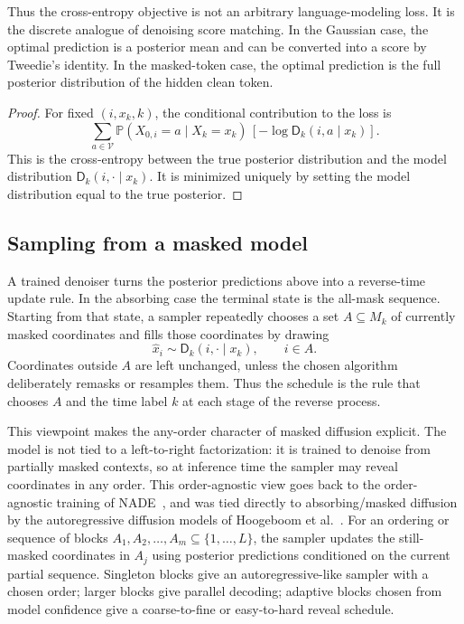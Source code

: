 \documentclass{amsart}
\numberwithin{equation}{section}
\theoremstyle{plain}
\theoremstyle{definition}
\theoremstyle{remark}
\newcommand{\Pp}{\mathbb{P}}
\newcommand{\mc}[1]{\mathcal{#1}}
\newcommand{\wh}[1]{\widehat{#1}}
\newcommand{\denoiser}{\mathsf{D}}
\begin{document}
Thus the cross-entropy objective is not an arbitrary language-modeling loss.
It is the discrete analogue of denoising score matching.  In the Gaussian case,
the optimal prediction is a posterior mean and can be converted into a score by
Tweedie's identity.  In the masked-token case, the optimal prediction is the
full posterior distribution of the hidden clean token.

\begin{proof}
For fixed $(i,x_k,k)$, the conditional contribution to the loss is
\[
    \sum_{a\in\mc{V}}
    \Pp(X_{0,i}=a\mid X_k=x_k)\,[-\log \denoiser_k(i,a\mid x_k)].
\]
This is the cross-entropy between the true posterior distribution and the
model distribution $\denoiser_k(i,\cdot\mid x_k)$.  It is minimized uniquely by
setting the model distribution equal to the true posterior.
\end{proof}

\subsection{Sampling from a masked model}
\label{subsec:masked-sampling}

A trained denoiser turns the posterior predictions above into a reverse-time
update rule.  In the absorbing case the terminal state is the all-mask
sequence.  Starting from that state, a sampler repeatedly chooses a set
$A\subseteq M_k$ of currently masked coordinates and fills those coordinates by
drawing
\[
    \wh x_i\sim \denoiser_k(i,\cdot\mid x_k),
    \qquad i\in A.
\]
Coordinates outside $A$ are left unchanged, unless the chosen algorithm
deliberately remasks or resamples them.  Thus the schedule is the rule that
chooses $A$ and the time label $k$ at each stage of the reverse process.

This viewpoint makes the any-order character of masked diffusion explicit.  The
model is not tied to a left-to-right factorization: it is trained to denoise
from partially masked contexts, so at inference time the sampler may reveal
coordinates in any order.  This order-agnostic view goes back to the
order-agnostic training of NADE~\cite{uria2014nade}, and was tied directly to
absorbing/masked diffusion by the autoregressive diffusion models of Hoogeboom
et al.~\cite{hoogeboom2022ardm}.  For an ordering or sequence of blocks
$A_1,A_2,\ldots,A_m\subseteq\{1,\ldots,L\}$, the sampler updates the
still-masked coordinates in $A_j$ using posterior predictions conditioned on
the current partial sequence.  Singleton blocks give an autoregressive-like
sampler with a chosen order; larger blocks give parallel decoding; adaptive
blocks chosen from model confidence give a coarse-to-fine or easy-to-hard
reveal schedule.
\end{document}
